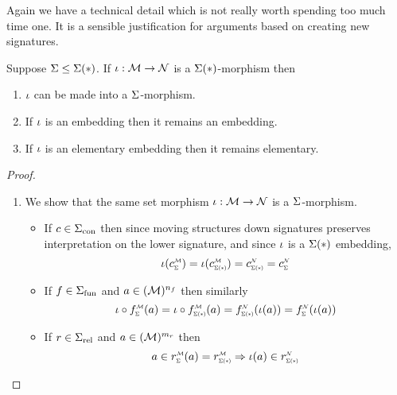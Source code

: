 Again we have a technical detail which is not really worth spending too much
time one. 
It is a sensible justification for arguments based on creating new signatures.
\begin{lem}
    Suppose $\Sigma \leq \Sigma(*)$.
    If $\iota : \mathcal{M} \to \mathcal{N}$ is a $\Sigma(*)$-morphism then 
    \begin{enumerate}
        \item $\iota$ can be made into a $\Sigma$-morphism.
        \item If $\iota$ is an embedding then it remains an embedding.
        \item If $\iota$ is an elementary embedding then it remains elementary. 
    \end{enumerate}
\end{lem}
\begin{proof}
    \begin{enumerate}
        \item {}
            We show that the same set morphism 
            $\iota : {\mathcal{M}} \to {\mathcal{N}}$
            is a $\Sigma$-morphism.
            \begin{itemize}
                \item If $c \in {\Sigma}_\mathrm{con}$ then since moving structures down
                    signatures preserves interpretation on the lower signature,
                    and since $\iota$ is a $\Sigma(*)$ embedding,
                    \[
                        \io(\subintp{\Si}{\MM}{c}) 
                        = \io(\subintp{\Si(*)}{\MM}{c})
                        = \subintp{\Si(*)}{\NN}{c}
                        = \subintp{\Si}{\NN}{c}
                    \]
                \item If $f \in {\Sigma}_\mathrm{fun}$ and $a \in ({\mathcal{M}})^{n_f}$ 
                    then similarly
                    \[
                        \io \circ \subintp{\Si}{\MM}{f}(a)
                        = \io \circ \subintp{\Si(*)}{\MM}{f}(a)
                        = \subintp{\Si(*)}{\NN}{f}(\io(a))
                        = \subintp{\Si}{\NN}{f}(\io(a))
                    \]
                \item If $r \in {\Sigma}_\mathrm{rel}$ and $a \in ({\mathcal{M}})^{m_r}$
                    then 
                    \[
                        a \in \subintp{\Si}{\MM}{r}(a)
                        = \subintp{\Si(*)}{\MM}{r}
                        \implies \io(a)  \in \subintp{\Si(*)}{\NN}{r}
\]
\end{itemize}
\end{enumerate}
\end{proof}
